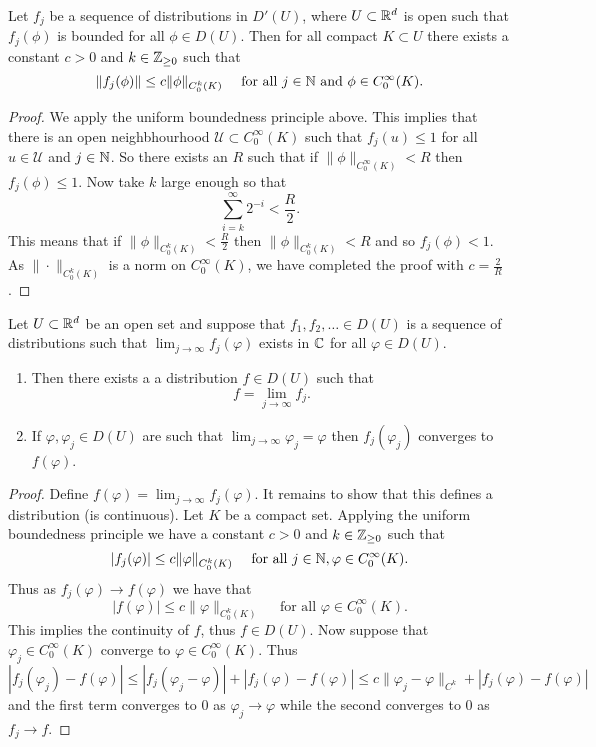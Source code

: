 \documentclass[twoside, a4paper, 10pt]{amsart}
\begin{document}
\begin{thm} Let $f_j$ be a sequence of distributions in $D'(U)$, where $U \subset \mathbb{R}^d$ is open such that $f_j(\phi)$ is bounded for all $\phi \in D(U)$. Then for all compact $K \subset U$ there exists a constant $c>0$ and $k \in \mathbb{Z}_{\geq 0}$ such that $$\|f_j(\phi)\| \leq c \| \phi \|_{C_0^k(K)} \quad \text{ for all } j \in \mathbb{N} \text{ and } \phi \in C_0^{\infty}(K).$$

\end{thm}

\begin{proof} We apply the uniform boundedness principle above. This implies that there is an open neighbhourhood $\mathcal{U} \subset C_0^{\infty}(K)$ such that $f_j(u) \leq 1$ for all $u \in \mathcal{U}$ and $j \in \mathbb{N}$. So there exists an $R$ such that if $\| \phi \|_{C_0^{\infty}(K)} < R$ then $f_j(\phi) \leq 1$. Now take $k$ large enough so that $$\sum_{i=k}^{\infty} 2^{-i} < \frac{R}{2}.$$ This means that if $\|\phi \|_{C_0^{k}(K)} < \frac{R}{2}$ then $\| \phi \|_{C_0^k(K)} < R$ and so $f_j(\phi) < 1$. As $\|\cdot \|_{C_0^k(K)}$ is a norm on $C_0^{\infty}(K)$, we have completed the proof with $c= \frac{2}{R}$.  \end{proof}

\begin{thm} Let $U \subset \mathbb{R}^d$ be an open set and suppose that $f_1,f_2, \ldots \in D(U)$ is a sequence of distributions such that $\lim_{j\to \infty} f_j(\varphi)$ exists in $\mathbb{C}$ for all $\varphi \in D(U)$. 
\begin{enumerate}
	\item Then there exists a a distribution $f \in D(U)$ such that $$f = \lim_{j \to \infty} f_j.$$
	\item If $\varphi, \varphi_j \in D(U)$ are such that $\lim_{j \to \infty} \varphi_j = \varphi$ then $f_j(\varphi_j)$ converges to $f(\varphi)$.
\end{enumerate}

\end{thm}

\begin{proof} Define $f(\varphi) = \lim_{j \to \infty} f_j(\varphi)$. It remains to show that this defines a distribution (is continuous). Let $K$ be a compact set. Applying the uniform boundedness principle we have a constant $c>0$ and $k \in \mathbb{Z}_{\geq 0}$ such that $$|f_j(\varphi)| \leq c \| \varphi \|_{C_0^k(K)} \quad \text{ for all } j \in \mathbb{N}, \varphi \in C_0^{\infty}(K).$$ Thus as $f_j(\varphi) \to f(\varphi)$ we have that $$|f(\varphi)| \leq c \| \varphi \|_{C_0^k(K)} \quad \text{ for all } \varphi \in C_0^{\infty}(K).$$ This implies the continuity of $f$, thus $f \in D(U)$. Now suppose that $\varphi_j \in C_0^{\infty}(K)$ converge to $\varphi \in C_0^{\infty}(K)$. Thus $$|f_j(\varphi_j) - f(\varphi)| \leq |f_j(\varphi_j - \varphi)| + |f_j(\varphi) - f(\varphi)| \leq c\|\varphi_j - \varphi\|_{C^k} +  |f_j(\varphi) - f(\varphi)|$$ and the first term converges to $0$ as $\varphi_j \to \varphi$ while the second converges to $0$ as $f_j \to f$.\end{proof}
\end{document}
